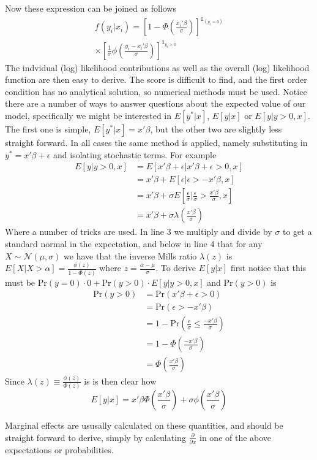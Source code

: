 Now these expression can be joined as follows
\begin{multline}
f(y_i| x_i) =
\left[
1 - \Phi \left(\frac{x_i'\beta}{\sigma}\right)
\right]^{\mathds{1}_{(y_i = 0)}}  \\
\times
\left[\frac{1}{\sigma} \phi\left( \frac{y_i - x_i'\beta}{\sigma}
\right)\right]^{\mathds{1}_{y_i > 0}}
\end{multline}
The indvidual (log) likelihood contributions as well as the overall (log) likelihood function are then easy to derive. The score is difficult to find, and the first order condition has no analytical solution, so numerical methods must be used. Notice there are a number of ways to answer questions about the expected value of our model, specifically we might be interested in $E[y^*|x]$, $E[y|x]$ or $E[y| y>0, x]$. The first one is simple, $E[y^*|x]= x'\beta$, but the other two are slightly less straight forward. In all cases the same method is applied, namely substituting in $y^* = x'\beta + \epsilon$ and isolating stochastic terms. For example
\begin{equation}
\begin{split}
E[y| y>0, x] &= E[x'\beta + \epsilon |x'\beta + \epsilon > 0 , x] \\
& = x'\beta + E[\epsilon| \epsilon > -x'\beta, x] \\
& = x'\beta + \sigma E\left[\frac{\epsilon}{\sigma}| \frac{\epsilon}{\sigma}> \frac{x'\beta}{\sigma}, x\right] \\
& = x'\beta + \sigma \lambda \left(\frac{x'\beta}{\sigma}\right)
\end{split}
\end{equation}
Where a number of tricks are used. In line 3 we multiply and divide by $\sigma$ to get a standard normal in the expectation, and below in line 4 that for any $X\sim\mathcal{N}(\mu,\sigma)$ we have that the inverse Mills ratio $\lambda(z)$ is  $E[X|X>\alpha]=\frac{\phi(z)}{1- \Phi(z)}$ where $z = \frac{\alpha-\mu }{\sigma}$. To derive $E[y|x]$ first notice that this must be $\textrm{Pr}(y=0)\cdot 0 + \textrm{Pr}(y>0)\cdot E[y|y>0, x]$ and $\textrm{Pr}(y>0)$ is
\begin{equation}
\begin{split}
\textrm{Pr}(y>0) &= \textrm{Pr}(x'\beta + \epsilon>0) \\
& = \textrm{Pr}(\epsilon > - x'\beta) \\
& =1 - \textrm{Pr}\left(\frac{\epsilon}{\sigma} \leq \frac{-x'\beta}{\sigma}\right) \\
& = 1- \Phi \left(\frac{-x'\beta}{\sigma}\right) \\
& = \Phi \left(\frac{x'\beta}{\sigma}\right)
\end{split}
\end{equation}
Since $\lambda(z) \equiv \frac{\phi(z)}{\Phi(z)}$ is is then clear how
\begin{equation}
E[y|x] = x'\beta \Phi \left(\frac{x'\beta}{\sigma}\right) + \sigma \phi \left(\frac{x'\beta}{\sigma}\right)
\end{equation}

Marginal effects are ususally calculated on these quantities, and should be straight forward to derive, simply by calculating $\frac{\partial}{\partial x}$ in one of the above expectations or probabilities.
